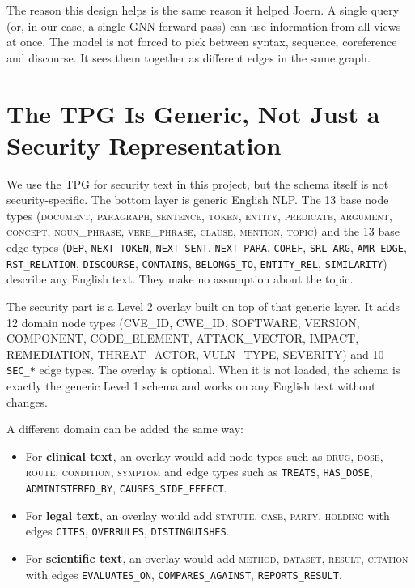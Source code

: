\documentclass[11pt]{article}
\begin{document}
The reason this design helps is the same reason it helped Joern. A
single query (or, in our case, a single GNN forward pass) can use
information from all views at once. The model is not forced to pick
between syntax, sequence, coreference and discourse. It sees them
together as different edges in the same graph.

\section{The TPG Is Generic, Not Just a Security Representation}

We use the TPG for security text in this project, but the schema
itself is not security-specific. The bottom layer is generic English
NLP. The 13 base node types (\textsc{document}, \textsc{paragraph},
\textsc{sentence}, \textsc{token}, \textsc{entity}, \textsc{predicate},
\textsc{argument}, \textsc{concept}, \textsc{noun\_phrase},
\textsc{verb\_phrase}, \textsc{clause}, \textsc{mention},
\textsc{topic}) and the 13 base edge types (\texttt{DEP},
\texttt{NEXT\_TOKEN}, \texttt{NEXT\_SENT}, \texttt{NEXT\_PARA},
\texttt{COREF}, \texttt{SRL\_ARG}, \texttt{AMR\_EDGE},
\texttt{RST\_RELATION}, \texttt{DISCOURSE}, \texttt{CONTAINS},
\texttt{BELONGS\_TO}, \texttt{ENTITY\_REL}, \texttt{SIMILARITY})
describe any English text. They make no assumption about the topic.

The security part is a Level 2 overlay built on top of that generic
layer. It adds 12 domain node types (CVE\_ID, CWE\_ID, SOFTWARE,
VERSION, COMPONENT, CODE\_ELEMENT, ATTACK\_VECTOR, IMPACT,
REMEDIATION, THREAT\_ACTOR, VULN\_TYPE, SEVERITY) and 10
\texttt{SEC\_*} edge types. The overlay is optional. When it is not
loaded, the schema is exactly the generic Level 1 schema and works on
any English text without changes.

A different domain can be added the same way:

\begin{itemize}
    \item For \textbf{clinical text}, an overlay would add node types
    such as \textsc{drug}, \textsc{dose}, \textsc{route},
    \textsc{condition}, \textsc{symptom} and edge types such as
    \texttt{TREATS}, \texttt{HAS\_DOSE}, \texttt{ADMINISTERED\_BY},
    \texttt{CAUSES\_SIDE\_EFFECT}.
    \item For \textbf{legal text}, an overlay would add
    \textsc{statute}, \textsc{case}, \textsc{party}, \textsc{holding}
    with edges \texttt{CITES}, \texttt{OVERRULES}, \texttt{DISTINGUISHES}.
    \item For \textbf{scientific text}, an overlay would add
    \textsc{method}, \textsc{dataset}, \textsc{result},
    \textsc{citation} with edges \texttt{EVALUATES\_ON},
    \texttt{COMPARES\_AGAINST}, \texttt{REPORTS\_RESULT}.
\end{itemize}
\end{document}
